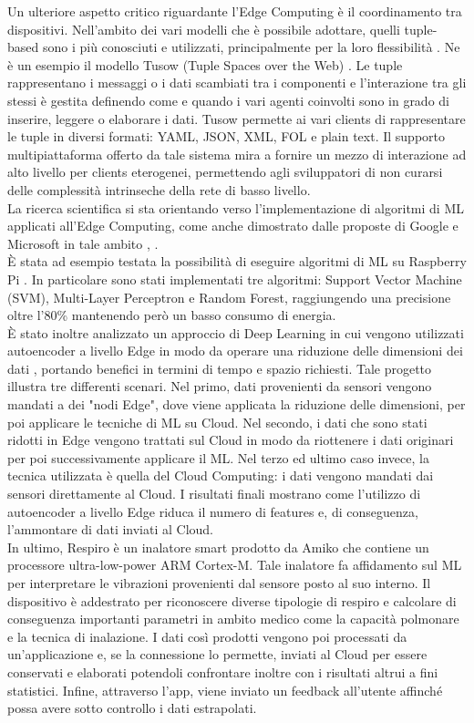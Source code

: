 Un ulteriore aspetto critico riguardante l'Edge Computing è il coordinamento tra dispositivi. Nell'ambito dei vari modelli che è possibile adottare, quelli tuple-based sono i più conosciuti e utilizzati, principalmente per la loro flessibilità \cite{tuple}. Ne è un esempio il modello Tusow (Tuple Spaces over the Web) \cite{tusow}. Le tuple rappresentano i messaggi o i dati scambiati tra i componenti e l'interazione tra gli stessi è gestita definendo come e quando i vari agenti coinvolti sono in grado di inserire, leggere o elaborare i dati. Tusow permette ai vari clients di rappresentare le tuple in diversi formati: YAML, JSON, XML, FOL e plain text. Il supporto multipiattaforma offerto da tale sistema mira a fornire un mezzo di interazione ad alto livello per clients eterogenei, permettendo agli sviluppatori di non curarsi delle complessità intrinseche della rete di basso livello.\\
La ricerca scientifica si sta orientando verso l'implementazione di algoritmi di ML applicati all'Edge Computing, come anche dimostrato dalle proposte di Google e Microsoft in tale ambito \cite{tflowres}, \cite{edgemlres}.\\
È stata ad esempio testata la possibilità di eseguire algoritmi di ML su Raspberry Pi \cite{mlrasp}. In particolare sono stati implementati tre algoritmi: Support Vector Machine (SVM), Multi-Layer Perceptron e Random Forest, raggiungendo una precisione oltre l'80\% mantenendo però un basso consumo di energia.\\
È stato inoltre analizzato un approccio di Deep Learning in cui vengono utilizzati autoencoder a livello Edge in modo da operare una riduzione delle dimensioni dei dati \cite{encoder}, portando benefici in termini di tempo e spazio richiesti. Tale progetto illustra tre differenti scenari. Nel primo, dati provenienti da sensori vengono mandati a dei "nodi Edge", dove viene applicata la riduzione delle dimensioni, per poi applicare le tecniche di ML su Cloud. Nel secondo, i dati che sono stati ridotti in Edge vengono trattati sul Cloud in modo da riottenere i dati originari per poi successivamente applicare il ML. Nel terzo ed ultimo caso invece, la tecnica utilizzata è quella del Cloud Computing: i dati vengono mandati dai sensori direttamente al Cloud. I risultati finali mostrano come l'utilizzo di autoencoder a livello Edge riduca il numero di features e, di conseguenza, l'ammontare di dati inviati al Cloud.\\
In ultimo, Respiro è un inalatore smart prodotto da Amiko \cite{respiro} che contiene un processore ultra-low-power ARM Cortex-M. Tale inalatore fa affidamento sul ML per interpretare le vibrazioni provenienti dal sensore posto al suo interno. Il dispositivo è addestrato per riconoscere diverse tipologie di respiro e calcolare di conseguenza importanti parametri in ambito medico come la capacità polmonare e la tecnica di inalazione. I dati così prodotti vengono poi processati da un'applicazione e, se la connessione lo permette, inviati al Cloud per essere conservati e elaborati potendoli confrontare inoltre con i risultati altrui a fini statistici. Infine, attraverso l'app, viene inviato un feedback all'utente affinché possa avere sotto controllo i dati estrapolati.\\
